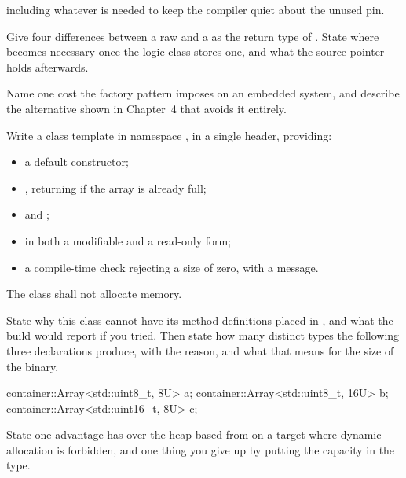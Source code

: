 \noindent including whatever is needed to keep the compiler quiet about the unused pin. 

 Give four differences between a raw  and a
 as the return type of . State where
 becomes necessary once the logic class stores one, and what the source pointer holds
afterwards. 

 Name one cost the factory pattern imposes on an embedded system, and describe the
alternative shown in Chapter~4 that avoids it entirely. 

\label{exb:q:7}

 Write a class template  in namespace , in a
single header, providing:
\begin{itemize}
  \item a default constructor;
  \item {}, returning  if the array is already full;
  \item {} and ;
  \item {} in both a modifiable and a read-only form;
  \item a compile-time check rejecting a size of zero, with a message.
\end{itemize}
The class shall not allocate memory. 

 State why this class cannot have its method definitions placed in , and
what the build would report if you tried. Then state how many distinct types the following three
declarations produce, with the reason, and what that means for the size of the binary. 

\begin{cppcode}
container::Array<std::uint8_t, 8U> a{};
container::Array<std::uint8_t, 16U> b{};
container::Array<std::uint16_t, 8U> c{};
\end{cppcode}

 State one advantage  has over the heap-based
 from  on a target where dynamic allocation is
forbidden, and one thing you give up by putting the capacity in the type. 

